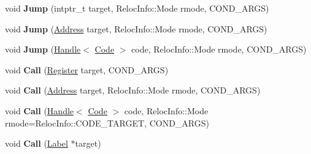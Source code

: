 \begin{DoxyCompactItemize}
\item 
\mbox{\label{classv8_1_1internal_1_1TurboAssembler_afd3d7a428a94de7bde684da976c65d66}} 
void {\bfseries Jump} (intptr\+\_\+t target, Reloc\+Info\+::\+Mode rmode, C\+O\+N\+D\+\_\+\+A\+R\+GS)
\item 
\mbox{\label{classv8_1_1internal_1_1TurboAssembler_ad222dbdd6fab20aad828c4710c8781f7}} 
void {\bfseries Jump} (\mbox{\hyperlink{classuintptr__t}{Address}} target, Reloc\+Info\+::\+Mode rmode, C\+O\+N\+D\+\_\+\+A\+R\+GS)
\item 
\mbox{\label{classv8_1_1internal_1_1TurboAssembler_ab29a2d8a3300314f87191c474024dea7}} 
void {\bfseries Jump} (\mbox{\hyperlink{classv8_1_1internal_1_1Handle}{Handle}}$<$ \mbox{\hyperlink{classv8_1_1internal_1_1Code}{Code}} $>$ code, Reloc\+Info\+::\+Mode rmode, C\+O\+N\+D\+\_\+\+A\+R\+GS)
\item 
\mbox{\label{classv8_1_1internal_1_1TurboAssembler_a030e59ab4b2d24bccba0d7b3a229c57c}} 
void {\bfseries Call} (\mbox{\hyperlink{classv8_1_1internal_1_1Register}{Register}} target, C\+O\+N\+D\+\_\+\+A\+R\+GS)
\item 
\mbox{\label{classv8_1_1internal_1_1TurboAssembler_abff836d514c2913a4dd126f8327ed085}} 
void {\bfseries Call} (\mbox{\hyperlink{classuintptr__t}{Address}} target, Reloc\+Info\+::\+Mode rmode, C\+O\+N\+D\+\_\+\+A\+R\+GS)
\item 
\mbox{\label{classv8_1_1internal_1_1TurboAssembler_a75ce7a3fea525aec019f52dd6b313c53}} 
void {\bfseries Call} (\mbox{\hyperlink{classv8_1_1internal_1_1Handle}{Handle}}$<$ \mbox{\hyperlink{classv8_1_1internal_1_1Code}{Code}} $>$ code, Reloc\+Info\+::\+Mode rmode=Reloc\+Info\+::\+C\+O\+D\+E\+\_\+\+T\+A\+R\+G\+ET, C\+O\+N\+D\+\_\+\+A\+R\+GS)
\item 
\mbox{\label{classv8_1_1internal_1_1TurboAssembler_a76c1a7002369fba1c520446e9e4cfc34}} 
void {\bfseries Call} (\mbox{\hyperlink{classv8_1_1internal_1_1Label}{Label}} $\ast$target)
\item 

\end{DoxyCompactItemize}
